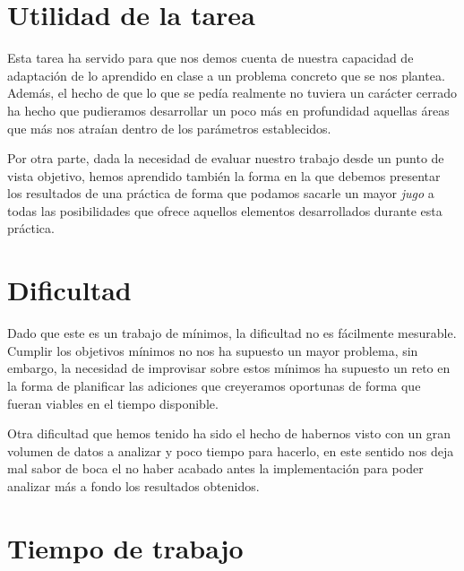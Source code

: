 \documentclass[a4paper]{report}
\begin{document}
	\section*{Utilidad de la tarea}
	Esta tarea ha servido para que nos demos cuenta de nuestra capacidad de adaptación de lo aprendido en clase a un problema concreto que se nos plantea. Además, el hecho de que lo que se pedía realmente no tuviera un carácter cerrado ha hecho que pudieramos desarrollar un poco más en profundidad aquellas áreas que más nos atraían dentro de los parámetros establecidos.
	
	Por otra parte, dada la necesidad de evaluar nuestro trabajo desde un punto de vista objetivo, hemos aprendido también la forma en la que debemos presentar los resultados de una práctica de forma que podamos sacarle un mayor \emph{jugo} a todas las posibilidades que ofrece aquellos elementos desarrollados durante esta práctica.
	\section*{Dificultad}
	Dado que este es un trabajo de mínimos, la dificultad no es fácilmente mesurable. Cumplir los objetivos mínimos no nos ha supuesto un mayor problema, sin embargo, la necesidad de improvisar sobre estos mínimos ha supuesto un reto en la forma de planificar las adiciones que creyeramos oportunas de forma que fueran viables en el tiempo disponible.
	
	Otra dificultad que hemos tenido ha sido el hecho de habernos visto con un gran volumen de datos a analizar y poco tiempo para hacerlo, en este sentido nos deja mal sabor de boca el no haber acabado antes la implementación para poder analizar más a fondo los resultados obtenidos.
	\section*{Tiempo de trabajo}
	
\end{document}
